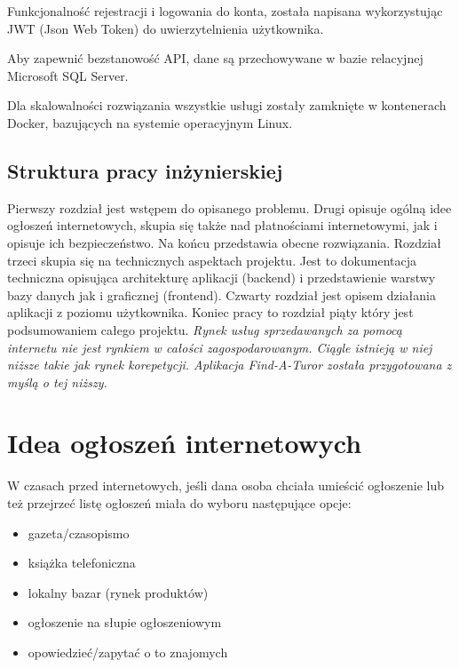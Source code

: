 \documentclass[12pt]{article}
\numberwithin{figure}{section}
\begin{document}
\begin{sloppypar}
Funkcjonalność rejestracji i logowania do konta, została napisana wykorzystując JWT (Json Web Token) do uwierzytelnienia użytkownika.

Aby zapewnić bezstanowość API, dane są przechowywane w bazie relacyjnej Microsoft SQL Server.

Dla skalowalności rozwiązania wszystkie usługi zostały zamknięte w kontenerach Docker, bazujących na systemie operacyjnym Linux.

\subsection{Struktura pracy inżynierskiej}
Pierwszy rozdział jest wstępem do opisanego problemu. Drugi opisuje ogólną idee ogłoszeń internetowych, skupia się także nad płatnościami internetowymi, jak i opisuje ich bezpieczeństwo. Na końcu przedstawia obecne rozwiązania. Rozdział trzeci skupia się na technicznych aspektach projektu. Jest to dokumentacja techniczna opisująca architekturę aplikacji (backend) i przedstawienie warstwy bazy danych jak i graficznej (frontend). Czwarty rozdział jest opisem działania aplikacji z poziomu użytkownika. Koniec pracy to rozdział piąty który jest podsumowaniem całego projektu.
\newline
\newline
\textit{Rynek usług sprzedawanych za pomocą internetu nie jest rynkiem w całości zagospodarowanym. Ciągle istnieją w niej niższe takie jak rynek korepetycji. Aplikacja Find-A-Turor została przygotowana z myślą o tej niższy.}
\section{Idea ogłoszeń internetowych}
W czasach przed internetowych, jeśli dana osoba chciała umieścić ogłoszenie lub też przejrzeć listę ogłoszeń miała do wyboru następujące opcje:
\begin{itemize}
    \item gazeta/czasopismo
    \item książka telefoniczna
    \item lokalny bazar (rynek produktów)
    \item ogłoszenie na słupie ogłoszeniowym
    \item opowiedzieć/zapytać o to znajomych
\end{itemize}


\end{sloppypar}
\end{document}
